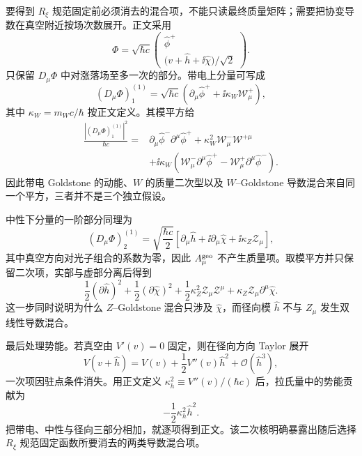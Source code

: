 \begin{derivation}
要得到 \(R_\xi\) 规范固定前必须消去的混合项，不能只读最终质量矩阵；需要把协变导数在真空附近按场次数展开。正文采用
\begin{equation*}
\Phi
=\sqrt{\hbar c}
\begin{pmatrix}
\widehat\phi^+\\[2pt]
\bigl(v+\widehat h+\ii\widehat\chi\bigr)/\sqrt2
\end{pmatrix}.
\end{equation*}
只保留 \(D_\mu\Phi\) 中对涨落场至多一次的部分。带电上分量可写成
\begin{equation*}
(D_\mu\Phi)_1^{(1)}
=\sqrt{\hbar c}\left(
\partial_\mu\widehat\phi^+
+\ii\kappa_W\mathcal W_\mu^+
\right),
\end{equation*}
其中 \(\kappa_W=m_Wc/\hbar\) 按正文定义。其模平方给
\begin{align*}
\frac{|(D_\mu\Phi)_1^{(1)}|^2}{\hbar c}
={}&\partial_\mu\widehat\phi^-\partial^\mu\widehat\phi^+
+\kappa_W^2\mathcal W^-_\mu\mathcal W^{+\mu}\\
&+\ii\kappa_W
\left(
\mathcal W^-_\mu\partial^\mu\widehat\phi^+
-\mathcal W^+_\mu\partial^\mu\widehat\phi^-
\right).
\end{align*}
因此带电 Goldstone 的动能、\(W\) 的质量二次型以及 \(W\)--Goldstone 导数混合来自同一个平方，三者并不是三个独立假设。

中性下分量的一阶部分同理为
\begin{equation*}
(D_\mu\Phi)_2^{(1)}
=\sqrt{\frac{\hbar c}{2}}
\left[
\partial_\mu\widehat h
+\ii\partial_\mu\widehat\chi
+\ii\kappa_Z\mathcal Z_\mu
\right],
\end{equation*}
其中真空方向对光子组合的系数为零，因此 \(A_\mu^{\rm geo}\) 不产生质量项。取模平方并只保留二次项，实部与虚部分离后得到
\begin{equation*}
\frac12(\partial\widehat h)^2
+\frac12(\partial\widehat\chi)^2
+\frac12\kappa_Z^2\mathcal Z_\mu\mathcal Z^\mu
+\kappa_Z\mathcal Z_\mu\partial^\mu\widehat\chi.
\end{equation*}
这一步同时说明为什么 \(Z\)--Goldstone 混合只涉及 \(\widehat\chi\)，而径向模 \(\widehat h\) 不与 \(Z_\mu\) 发生双线性导数混合。

最后处理势能。若真空由 \(V'(v)=0\) 固定，则在径向方向 Taylor 展开
\begin{equation*}
V(v+\widehat h)
=V(v)+\frac12V''(v)\widehat h^2
+\mathcal O(\widehat h^3),
\end{equation*}
一次项因驻点条件消失。用正文定义 \(\kappa_h^2\equiv V''(v)/(\hbar c)\) 后，拉氏量中的势能贡献为
\begin{equation*}
-\frac12\kappa_h^2\widehat h^2.
\end{equation*}
把带电、中性与径向三部分相加，就逐项得到正文。该二次核明确暴露出随后选择 \(R_\xi\) 规范固定函数所要消去的两类导数混合项。
\end{derivation}

